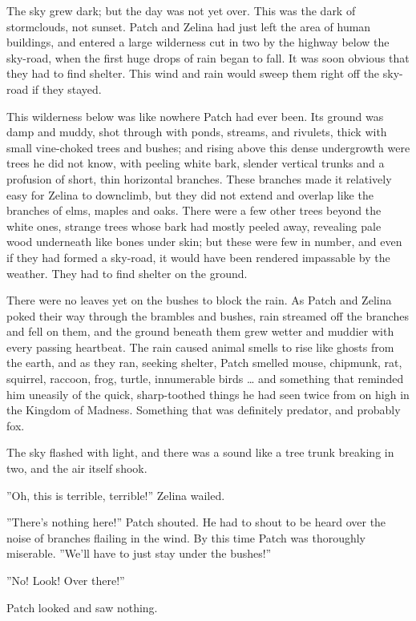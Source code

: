 \documentclass[12pt]{book}
\begin{document}
The sky grew dark; but the day was not yet over. This was the dark of
stormclouds, not sunset. Patch and Zelina had just left the area of
human buildings, and entered a large wilderness cut in two by the
highway below the sky-road, when the first huge drops of rain began to
fall. It was soon obvious that they had to find shelter. This wind and
rain would sweep them right off the sky-road if they stayed.

This wilderness below was like nowhere Patch had ever been. Its ground
was damp and muddy, shot through with ponds, streams, and rivulets,
thick with small vine-choked trees and bushes; and rising above this
dense undergrowth were trees he did not know, with peeling white bark,
slender vertical trunks and a profusion of short, thin horizontal
branches. These branches made it relatively easy for Zelina to
downclimb, but they did not extend and overlap like the branches of
elms, maples and oaks. There were a few other trees beyond the white
ones, strange trees whose bark had mostly peeled away, revealing pale
wood underneath like bones under skin; but these were few in number,
and even if they had formed a sky-road, it would have been rendered
impassable by the weather. They had to find shelter on the ground.

There were no leaves yet on the bushes to block the rain. As Patch and
Zelina poked their way through the brambles and bushes, rain streamed
off the branches and fell on them, and the ground beneath them grew
wetter and muddier with every passing heartbeat. The rain caused
animal smells to rise like ghosts from the earth, and as they ran,
seeking shelter, Patch smelled mouse, chipmunk, rat, squirrel,
raccoon, frog, turtle, innumerable birds \ldots{} and something that
reminded him uneasily of the quick, sharp-toothed things he had seen
twice from on high in the Kingdom of Madness. Something that was
definitely predator, and probably fox.

The sky flashed with light, and there was a sound like a tree trunk
breaking in two, and the air itself shook.

''Oh, this is terrible, terrible!'' Zelina wailed.

''There's nothing here!'' Patch shouted. He had to shout to be heard
over the noise of branches flailing in the wind. By this time Patch
was thoroughly miserable. ''We'll have to just stay under the
bushes!''

''No! Look! Over there!''

Patch looked and saw nothing.
\end{document}
